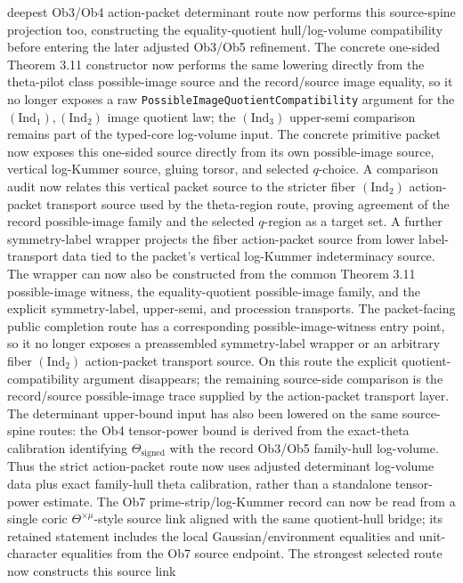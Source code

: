 \documentclass[11pt]{article}
\newcommand{\IndOne}{\ensuremath{\mathrm{Ind}_1}}
\newcommand{\IndTwo}{\ensuremath{\mathrm{Ind}_2}}
\newcommand{\IndThree}{\ensuremath{\mathrm{Ind}_3}}
\theoremstyle{plain}
\theoremstyle{definition}
\theoremstyle{remark}
\begin{document}
deepest Ob3/Ob4 action-packet determinant route now performs this source-spine
projection too, constructing the equality-quotient hull/log-volume
compatibility before entering the later adjusted Ob3/Ob5 refinement.  The
concrete one-sided Theorem 3.11 constructor now performs the same lowering
directly from the theta-pilot class possible-image source and the
record/source image equality, so it no longer exposes a raw
\texttt{PossibleImageQuotientCompatibility} argument for the
\((\IndOne),(\IndTwo)\) image quotient law; the \((\IndThree)\) upper-semi
comparison remains part of the typed-core log-volume input.  The
concrete primitive packet now exposes this one-sided source directly from its
own possible-image source, vertical log-Kummer source, gluing torsor, and
selected \(q\)-choice.  A comparison audit now relates this vertical packet
source to the stricter fiber \((\IndTwo)\) action-packet transport source used
by the theta-region route, proving agreement of the record possible-image
family and the selected \(q\)-region as a target set.  A further
symmetry-label wrapper projects the fiber action-packet source from lower
label-transport data tied to the packet's vertical log-Kummer indeterminacy
source.  The wrapper can now also be constructed from the common Theorem 3.11
possible-image witness, the equality-quotient possible-image family, and the
explicit symmetry-label, upper-semi, and procession transports.  The
packet-facing public completion route has a corresponding possible-image-witness
entry point, so it no longer exposes a preassembled symmetry-label wrapper or
an arbitrary fiber \((\IndTwo)\) action-packet transport source.  On this route
the explicit
quotient-compatibility argument disappears; the
remaining source-side comparison is the record/source possible-image trace
supplied by the action-packet transport layer.  The determinant upper-bound
input has also
been lowered on the same source-spine routes: the Ob4 tensor-power bound is
derived from the exact-theta calibration identifying
\(\Theta_{\mathrm{signed}}\) with the record Ob3/Ob5 family-hull log-volume.
Thus the strict action-packet route now uses adjusted determinant log-volume
data plus exact family-hull theta calibration, rather than a standalone
tensor-power estimate.  The Ob7 prime-strip/log-Kummer
record can now be read
from a single coric \(\Theta^{\times\mu}\)-style source link aligned with the
same quotient-hull bridge; its retained statement includes the local
Gaussian/environment equalities and unit-character equalities from the Ob7
source endpoint.  The strongest selected route now constructs this source link
\end{document}
